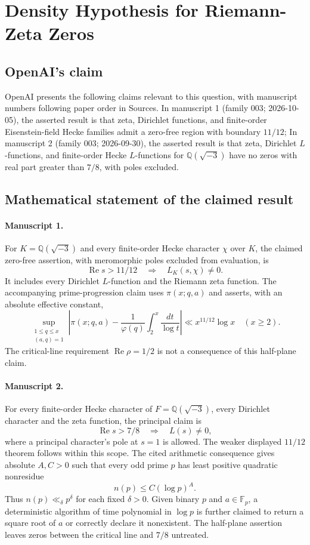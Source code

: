 \documentclass[11pt]{article}
\begin{document}
\section*{Density Hypothesis for Riemann-Zeta Zeros}

\subsection{OpenAI's claim}
OpenAI presents the following claims relevant to this question, with manuscript numbers following paper order in Sources. In manuscript 1 (family 003; 2026-10-05), the asserted result is that zeta, Dirichlet functions, and finite-order Eisenstein-field Hecke families admit a zero-free region with boundary $11/12$; In manuscript 2 (family 003; 2026-09-30), the asserted result is that zeta, Dirichlet $L$-functions, and finite-order Hecke $L$-functions for $\mathbb Q(\sqrt{-3})$ have no zeros with real part greater than $7/8$, with poles excluded.

\subsection{Mathematical statement of the claimed result}
\paragraph{Manuscript 1.}
For $K=\mathbb Q(\sqrt{-3})$ and every finite-order Hecke character $\chi$ over $K$, the claimed zero-free assertion, with meromorphic poles excluded from evaluation, is
\[
 \operatorname{Re}s>11/12\quad\Longrightarrow\quad L_K(s,\chi)\ne0.
\]
It includes every Dirichlet $L$-function and the Riemann zeta function. The accompanying prime-progression claim uses $\pi(x;q,a)$ and asserts, with an absolute effective constant,
\[
 \sup_{\substack{1\le q\le x\\(a,q)=1}}
 \left|\pi(x;q,a)-\frac1{\varphi(q)}\int_2^x\frac{dt}{\log t}\right|
 \ll x^{11/12}\log x\quad(x\ge2).
\]
The critical-line requirement $\operatorname{Re}\rho=1/2$ is not a consequence of this half-plane claim.

\paragraph{Manuscript 2.}
For every finite-order Hecke character of $F=\mathbb Q(\sqrt{-3})$, every Dirichlet character and the zeta function, the principal claim is
\[
 \operatorname{Re}s>7/8\quad\Longrightarrow\quad L(s)\ne0,
\]
where a principal character's pole at $s=1$ is allowed. The weaker displayed $11/12$ theorem follows within this scope. The cited arithmetic consequence gives absolute $A,C>0$ such that every odd prime $p$ has least positive quadratic nonresidue
\[
 n(p)\le C(\log p)^A.
\]
Thus $n(p)\ll_{\delta} p^{\delta}$ for each fixed $\delta>0$. Given binary $p$ and $a\in\mathbb F_p$, a deterministic algorithm of time polynomial in $\log p$ is further claimed to return a square root of $a$ or correctly declare it nonexistent. The half-plane assertion leaves zeros between the critical line and $7/8$ untreated.
\end{document}
